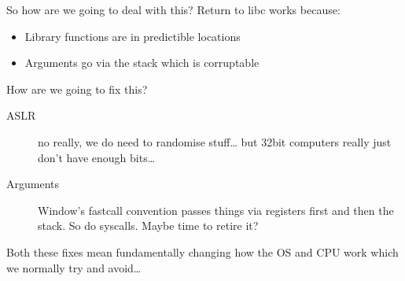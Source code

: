 \documentclass[9pt,aspectratio=169]{beamer}
\begin{document}
\begin{frame}[label={sec:org4b15ea2}]{So how are we going to deal with this?}
Return to libc works because:
\begin{itemize}
\item Library functions are in predictible locations
\item Arguments go via the stack which is corruptable
\end{itemize}

\begin{block}{How are we going to fix this?}
\begin{description}
\item[{ASLR}] no really, we do need to randomise stuff\ldots{} but 32bit computers really just don't have enough bits\ldots{}
\item[{Arguments}] Window's fastcall convention passes things via registers first and then the stack. So do syscalls.  Maybe time to retire it?
\end{description}

Both these fixes mean fundamentally changing how the OS and CPU work which we normally try and avoid\ldots{}
\end{block}
\end{frame}
\end{document}
